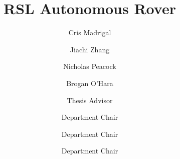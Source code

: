 \documentclass{scu-thesis}
\author{Cris Madrigal}
\author{Jiachi Zhang}
\author{Nicholas Peacock}
\author{Brogan O'Hara}
\title{RSL Autonomous Rover}
\begin{document}
\frontmatter
\signature{Thesis Advisor}
\signature{Department Chair}
\signature{Department Chair}
\signature{Department Chair}

\maketitle
%

\tableofcontents
\listoffigures

\mainmatter



\backmatter


\end{document}
